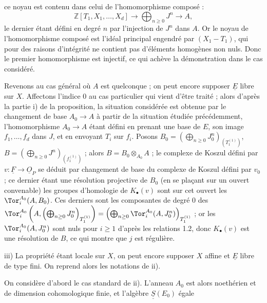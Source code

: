 
ce noyau est contenu dans celui de l'homomorphisme composé :
\[
\mathbb Z[T_1,X_1,\ldots,X_d]\longrightarrow
\bigoplus_{n\ge0}J^n\longrightarrow A,
\]
le dernier étant défini en degré \(n\) par l'injection de \(J^n\) dans \(A\). Or le noyau de l'homomorphisme composé est l'idéal principal engendré par \((X_1-T_1)\), qui pour des raisons d'intégrité ne contient pas d'éléments homogènes non nuls. Donc le premier homomorphisme est injectif, ce qui achève la démonstration dans le cas considéré.

Revenons au cas général où \(A\) est quelconque ; on peut encore supposer \(\underline{E}\) libre sur \(X\). Affectons l'indice \(0\) au cas particulier qui vient d'être traité ; alors d'après la partie i) de la proposition, la situation considérée est obtenue par le changement de base \(A_0\to A\) à partir de la situation étudiée précédemment, l'homomorphisme \(A_0\to A\) étant défini en prenant une base de \(E\), son image \(f_1,\ldots,f_d\) dans \(J\), et en envoyant \(T_i\) sur \(f_i\). Posons \(B_0=\left(\bigoplus_{n\ge0}J_0^n\right)_{(T_1^{(1)})}\), \(B=\left(\bigoplus_{n\ge0}J^n\right)_{(f_1^{(1)})}\) ; alors \(B=B_0\otimes_{A_0}A\) ; le complexe de Koszul défini par \(v:\underline{F}\to\underline{O}_P\) se déduit par changement de base du complexe de Koszul défini par \(v_0\) ; ce dernier étant une résolution projective de \(B_0\) (en se plaçant sur un ouvert convenable) les groupes d'homologie de \(K_\bullet(v)\) sont sur cet ouvert les \(\Tor_i^{A_0}(A,B_0)\). Ces derniers sont les composantes de degré \(0\) des \(\Tor_i^{A_0}\left(A,\left(\bigoplus_{n\ge0}J_0^n\right)_{T_1^{(1)}}\right)=\left(\bigoplus_{n\ge0}\Tor_i^{A_0}(A,J_0^n)\right)_{T_1^{(1)}}\) ; or les \(\Tor_i^{A_0}(A,J_0^n)\) sont nuls pour \(i\ge1\) d'après les relations 1.2, donc \(K_\bullet(v)\) est une résolution de \(B\), ce qui montre que \(j\) est régulière.

iii) La propriété étant locale sur \(X\), on peut encore supposer \(X\) affine et \(\underline{E}\) libre de type fini. On reprend alors les notations de ii).

On considère d'abord le cas standard de ii). L'anneau \(A_0\) est alors noethérien et de dimension cohomologique finie, et l'algèbre \(\underline{\underline{S}}(E_0)\)
égale%
